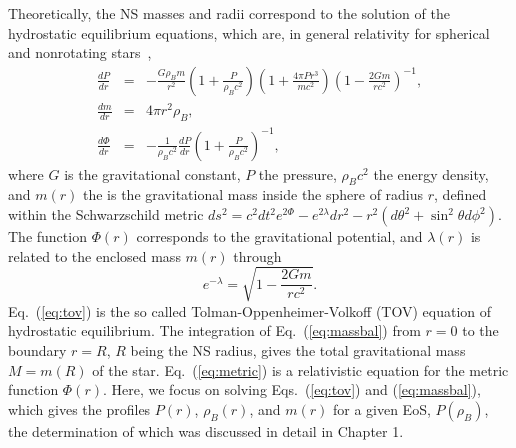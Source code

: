 Theoretically, the NS masses and radii correspond to the 
solution of the hydrostatic equilibrium equations, which are, in general 
relativity for spherical and nonrotating stars~\cite{Tolman1939,Oppenheimer1939},
%
\begin{eqnarray}
  \frac{dP}{dr} &=& -\frac{G\rho_B m}{r^2}\left(1 + \frac{P}{\rho_B
  c^2}\right)\left(1+\frac{4\pi
  Pr^3}{mc^2}\right)\left(1-\frac{2Gm}{rc^2}\right)^{-1},\label{eq:tov}\\
      \frac{dm}{dr} &=& 4\pi r^2\rho_B,\label{eq:massbal}\\
  \frac{d\Phi}{dr} &=& -\frac{1}{\rho_B
    c^2}\frac{dP}{dr}\left(1+\frac{P}{\rho_B
  c^2}\right)^{-1}\label{eq:metric},
\end{eqnarray}
%
where $G$ is the gravitational constant, $P$ the pressure, $\rho_B c^2$ the
energy density, and $m(r)$ the is the gravitational mass inside the sphere of
radius $r$, defined within the Schwarzschild metric $ds^2 = c^2dt^2e^{2\Phi} 
- e^{2\lambda}dr^2 - r^2(d\theta^2 + \sin^2\theta d\phi^2)$. The function 
$\Phi(r)$ corresponds to the gravitational potential, and $\lambda(r)$ is 
related to the enclosed mass $m(r)$ through
%
\begin{equation}
  e^{-\lambda} = \sqrt{1-\frac{2Gm}{rc^2}}.
\end{equation}
%
Eq.~(\ref{eq:tov}) is the so called Tolman-Oppenheimer-Volkoff (TOV) equation 
of hydrostatic equilibrium. The integration of Eq.~(\ref{eq:massbal}) from
$r=0$ to the boundary $r=R$, $R$ being the NS radius, gives the total
gravitational mass $M=m(R)$ of the star. Eq.~(\ref{eq:metric}) is a 
relativistic equation for the metric function $\Phi(r)$. Here, we focus on 
solving Eqs.~(\ref{eq:tov}) and 
(\ref{eq:massbal}), which gives the profiles $P(r)$, $\rho_B(r)$, and $m(r)$ 
for a given EoS, $P(\rho_B)$, the determination of which was discussed in detail 
in Chapter 1.

